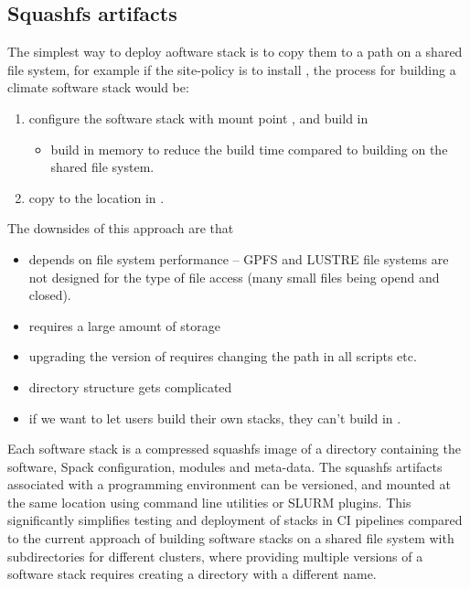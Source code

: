 \subsection{Squashfs artifacts}

The simplest way to deploy aoftware stack is to copy them to a path on a shared file system, for example if the site-policy is to install , the process for building a climate software stack  would be:
\begin{enumerate}
    \item configure the software stack with mount point , and build in 
    \begin{itemize}
        \item build in memory to reduce the build time compared to building on the shared file system.
    \end{itemize}
    \item copy  to the location in .
\end{enumerate}

The downsides of this approach are that
\begin{itemize}
    \item depends on file system performance -- GPFS and LUSTRE file systems are not designed for the type of file access (many small files being opend and closed).
    \item requires a large amount of storage
    \item upgrading the version of requires changing the path in all scripts etc.
    \item directory structure gets complicated
    \item if we want to let users build their own stacks, they can't build in .
\end{itemize}

Each software stack is a compressed squashfs image of a directory containing the software, Spack configuration, modules and meta-data.
The squashfs artifacts associated with a programming environment can be versioned, and mounted at the same location using command line utilities or SLURM plugins.
This significantly simplifies testing and deployment of stacks in CI pipelines compared to the current approach of building software stacks on a shared file system with subdirectories for different clusters, where providing multiple versions of a software stack requires creating a directory with a different name.

